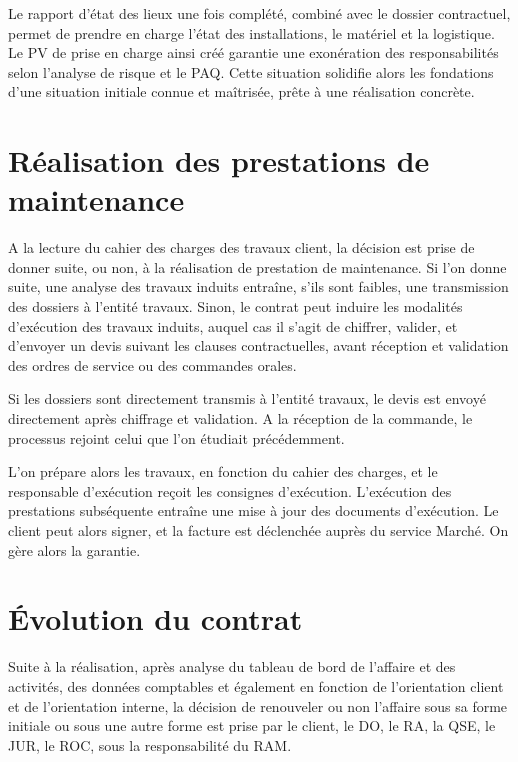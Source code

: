 Le rapport d’état des lieux une fois complété, combiné avec le dossier contractuel, permet de prendre en charge l’état des installations, le matériel et la logistique. Le PV de prise en charge ainsi créé garantie une exonération des responsabilités selon l’analyse de risque et le PAQ. Cette situation solidifie alors les fondations d’une situation initiale connue et maîtrisée, prête à une réalisation concrète.

%

\section{Réalisation des prestations de maintenance}

A la lecture du cahier des charges des travaux client, la décision est prise de donner suite, ou non, à la réalisation de prestation de maintenance. Si l’on donne suite, une analyse des travaux induits entraîne, s’ils sont faibles, une transmission des dossiers à l’entité travaux. Sinon, le contrat peut induire les modalités d’exécution des travaux induits, auquel cas il s’agit de chiffrer, valider, et d’envoyer un devis suivant les clauses contractuelles, avant réception et validation des ordres de service ou des commandes orales.

Si les dossiers sont directement transmis à l’entité travaux, le devis est envoyé directement après chiffrage et validation. A la réception de la commande, le processus rejoint celui que l’on étudiait précédemment.

L’on prépare alors les travaux, en fonction du cahier des charges, et le responsable d’exécution reçoit les consignes d’exécution. L’exécution des prestations subséquente entraîne une mise à jour des documents d’exécution. Le client peut alors signer, et la facture est déclenchée auprès du service Marché. On gère alors la garantie.

\section{Évolution du contrat}

Suite à la réalisation, après analyse du tableau de bord de l’affaire et des activités, des données comptables et également en fonction de l’orientation client et de l’orientation interne, la décision de renouveler ou non l’affaire sous sa forme initiale ou sous une autre forme est prise par le client, le DO, le RA, la QSE, le JUR, le ROC, sous la responsabilité du RAM.

